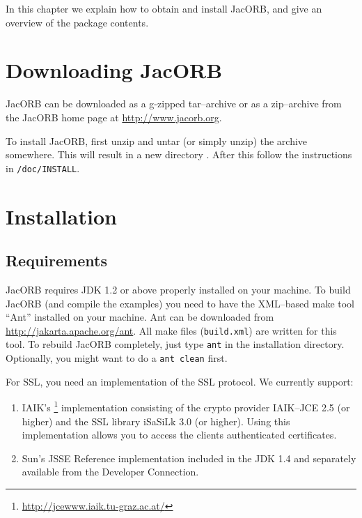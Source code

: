 
In this chapter  we explain how to obtain and  install JacORB, and give
an overview of the package contents.

\section{Downloading JacORB}


JacORB can be downloaded as a g-zipped tar--archive or as a zip--archive
from the  JacORB home page  at
\href{http://www.jacorb.org}{http://www.jacorb.org}.

To install JacORB, first unzip  and untar (or simply unzip) the archive
somewhere.  This will result  in a new directory {\tt \JacORBDir}.
After this follow the instructions in {\tt \JacORBDir/doc/INSTALL}.

\section{Installation}
\label{Sec_installation}

\subsection{Requirements}

JacORB requires JDK 1.2 or above properly installed on your machine.  To build
JacORB (and compile the examples) you need to have the XML--based make tool
``Ant'' installed on your machine.  Ant can be downloaded from
\href{http://jakarta.apache.org/ant}{http://jakarta.apache.org/ant}. All make
files ({\tt build.xml}) are written for this tool. To rebuild JacORB
completely, just type {\tt ant} in the installation directory.  Optionally,
you might want to do a {\tt ant clean} first.

For SSL, you need an implementation of the SSL protocol. We currently support:

\begin{enumerate}
\item IAIK's
  \footnote{\href{http://jcewww.iaik.tu-graz.ac.at}{http://jcewww.iaik.tu-graz.ac.at/}}
  implementation consisting of the crypto provider IAIK--JCE 2.5 (or higher)
  and the SSL library iSaSiLk 3.0 (or higher). Using this implementation
  allows you to access the clients authenticated certificates.
\item Sun's JSSE Reference implementation included in the JDK 1.4 and
  separately available from the Developer Connection.
\end{enumerate}


